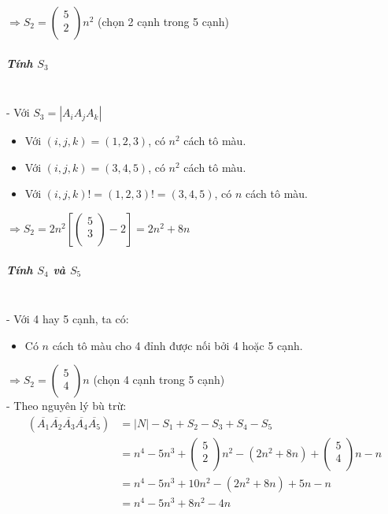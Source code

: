 \documentclass[12pt]{article}
\begin{document}
\begin{sloppypar}
\(\Rightarrow S_{2} =  \begin{pmatrix} 5 \\ 2 \\ \end{pmatrix}n^{2}\) (chọn 2 cạnh trong 5 cạnh) 


\subparagraph{Tính \(S_{3}\)}\mbox{}\\

- Với \(S_{3} = |A_{i}A_{j}{A_{k}}|\)
\begin{itemize}
    \item Với \((i,j,k) = (1,2,3)\), có \(n^{2}\) cách tô màu.
    \item Với \((i,j,k) = (3,4,5)\), có \(n^{2}\) cách tô màu.
    \item Với \((i,j,k) != (1,2,3) != (3,4,5)\), có \(n\) cách tô màu.
\end{itemize}

\(\Rightarrow S_{2} = 2n^{2}\left[\begin{pmatrix} 5 \\ 3 \\ \end{pmatrix} - 2\right] = 2n^{2} + 8n\)


\subparagraph{Tính \(S_{4}\) và \(S_{5}\)}\mbox{}\\

- Với 4 hay 5 cạnh, ta có:
\begin{itemize}
    \item Có \(n\) cách tô màu cho 4 đỉnh được nối bởi 4 hoặc 5 cạnh.
\end{itemize}

\(\Rightarrow S_{2} =  \begin{pmatrix} 5 \\ 4 \\ \end{pmatrix}n\) (chọn 4 cạnh trong 5 cạnh) \\

- Theo nguyên lý bù trừ:
\begin{align*}
    (\overline{A_{1}}\overline{A_{2}}\overline{A_{3}}\overline{A_{4}}\overline{A_{5}}) & = |N| - S_{1} + S_{2} - S_{3} + S_{4} - S_{5} \\
    & = n^{4} - 5n^{3} + \begin{pmatrix} 5 \\ 2 \\ \end{pmatrix}n^{2} - (2n^{2} + 8n) + \begin{pmatrix} 5 \\ 4 \\ \end{pmatrix}n-n \\
    & = n^{4} - 5n^{3} + 10n^{2} - (2n^{2} + 8n) + 5n -n \\
    & = n^{4} - 5n^{3} + 8n^{2} - 4n
\end{align*}


\end{sloppypar}
\end{document}
